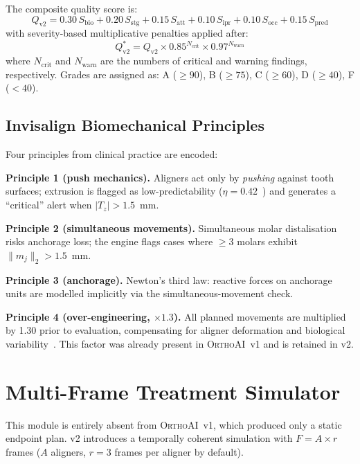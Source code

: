 \documentclass[10pt,twocolumn]{article}
\newcommand{\orthoai}{\textsc{OrthoAI}}
\newcommand{\vone}{\orthoai{}~v1}
\begin{document}
The composite quality score is:
\begin{equation}
  Q_\text{v2} = 0.30\,S_\text{bio} + 0.20\,S_\text{stg} +
    0.15\,S_\text{att} + 0.10\,S_\text{ipr} +
    0.10\,S_\text{occ} + 0.15\,S_\text{pred}
  \label{eq:composite}
\end{equation}
with severity-based multiplicative penalties applied after:
\begin{equation}
  Q_\text{v2}^* = Q_\text{v2}
    \times 0.85^{N_\text{crit}}
    \times 0.97^{N_\text{warn}}
  \label{eq:penalties}
\end{equation}
where $N_\text{crit}$ and $N_\text{warn}$ are the numbers of
critical and warning findings, respectively.
Grades are assigned as: A ($\geq 90$), B ($\geq 75$),
C ($\geq 60$), D ($\geq 40$), F ($< 40$).

\subsection{Invisalign Biomechanical Principles}

Four principles from clinical practice are encoded:

\textbf{Principle 1 (push mechanics).}
Aligners act only by \emph{pushing} against tooth surfaces; extrusion is
flagged as low-predictability ($\eta = 0.42$~\cite{kravitz2009predictability})
and generates a ``critical'' alert when $|T_z| > 1.5$~mm.

\textbf{Principle 2 (simultaneous movements).}
Simultaneous molar distalisation risks anchorage loss; the engine flags
cases where $\geq 3$ molars exhibit $\|m_j\|_2 > 1.5$~mm.

\textbf{Principle 3 (anchorage).}
Newton's third law: reactive forces on anchorage units are
modelled implicitly via the simultaneous-movement check.

\textbf{Principle 4 (over-engineering, $\times 1.3$).}
All planned movements are multiplied by 1.30 prior to evaluation,
compensating for aligner deformation and biological variability~\cite{glaser2017invisalign}.
This factor was already present in \vone{} and is retained in v2.

\section{Multi-Frame Treatment Simulator}
\label{sec:frames}

This module is entirely absent from \vone{}, which produced only a static
endpoint plan.
v2 introduces a temporally coherent simulation with $F = A \times r$ frames
($A$ aligners, $r = 3$ frames per aligner by default).
\end{document}
